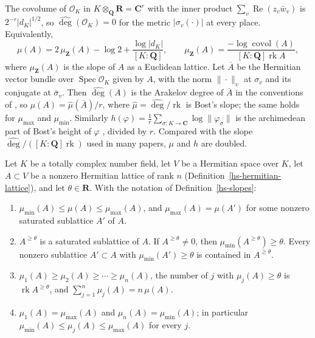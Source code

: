 \begin{remark}\label{hs-normalization}
The covolume of $\mathcal O_K$ in $K\otimes_{\mathbf Q}\mathbf R=\mathbf C^r$ with the inner
product $\sum_v\operatorname{Re}(z_v\bar w_v)$ is $2^{-r}|d_K|^{1/2}$, so
$\widehat{\deg}(\mathcal O_K)=0$ for the metric $|\sigma_v(\cdot)|$ at every place.
Equivalently,
\[
 \mu(A)=2\,\mu_{\mathbf Z}(A)-\log2+\frac{\log|d_K|}{[K:\mathbf Q]},
 \qquad \mu_{\mathbf Z}(A)=\frac{-\log\operatorname{covol}(A)}{[K:\mathbf Q]\operatorname{rk}A},
\]
where $\mu_{\mathbf Z}(A)$ is the slope of $A$ as a Euclidean lattice. Let $\overline A$ be the
Hermitian vector bundle over $\operatorname{Spec}\mathcal O_K$ given by $A$, with the norm
$\|\cdot\|_v$ at $\sigma_v$ and its conjugate at $\bar\sigma_v$. Then $\widehat{\deg}(A)$ is the
Arakelov degree of $\overline A$ in the conventions of \cite[\S1.3]{Bos20}, so
$\mu(A)=\widehat\mu(\overline A)/r$, where $\widehat\mu=\widehat{\deg}/\operatorname{rk}$ is
Bost's slope; the same holds for $\mu_{\max}$ and $\mu_{\min}$. Similarly
$h(\varphi)=\frac1r\sum_{\sigma:K\to\mathbf C}\log\|\varphi_\sigma\|$ is the archimedean part of
Bost's height of $\varphi$ \cite[\S1.4.3]{Bos20}, divided by $r$. Compared with the slope
$\widehat{\deg}/([K:\mathbf Q]\operatorname{rk})$ used in many papers, $\mu$ and $h$ are doubled.
\end{remark}

\begin{proposition}\label{hs-hn-polygon}
Let $K$ be a totally complex number field, let $V$ be a Hermitian space over $K$, let $A\subset V$
be a nonzero Hermitian lattice of rank $n$ (Definition~\ref{hs-hermitian-lattice}), and let
$\theta\in\mathbf R$. With the notation of Definition~\ref{hs-slopes}:
\begin{enumerate}
\item $\mu_{\min}(A)\leq\mu(A)\leq\mu_{\max}(A)$, and $\mu_{\max}(A)=\mu(A')$ for some nonzero
  saturated sublattice $A'$ of $A$.
\item $A^{\geq\theta}$ is a saturated sublattice of $A$. If $A^{\geq\theta}\neq0$, then
  $\mu_{\min}(A^{\geq\theta})\geq\theta$. Every nonzero sublattice $A'\subset A$ with
  $\mu_{\min}(A')\geq\theta$ is contained in $A^{\geq\theta}$.
\item $\mu_1(A)\geq\mu_2(A)\geq\cdots\geq\mu_n(A)$, the number of $j$ with
  $\mu_j(A)\geq\theta$ is $\operatorname{rk}A^{\geq\theta}$, and
  $\sum_{j=1}^n\mu_j(A)=n\,\mu(A)$.
\item $\mu_1(A)=\mu_{\max}(A)$ and $\mu_n(A)=\mu_{\min}(A)$; in particular
  $\mu_{\min}(A)\leq\mu_j(A)\leq\mu_{\max}(A)$ for every $j$.
\end{enumerate}
\end{proposition}

